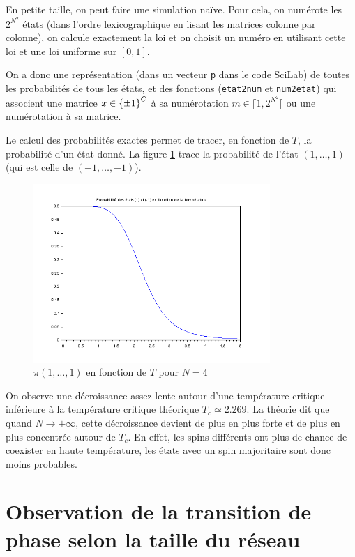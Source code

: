 \documentclass[a4paper,11pt]{article}
\begin{document}
En petite taille, on peut faire une simulation naïve. Pour cela, on numérote les $2^{N^2}$ états (dans l'ordre lexicographique en lisant les matrices colonne par colonne), on calcule exactement la loi et on choisit un numéro en utilisant cette loi et une loi uniforme sur $[0,1]$.

On a donc une représentation (dans un vecteur \texttt{p} dans le code SciLab) de toutes les probabilités de tous les états, et des fonctions (\texttt{etat2num} et \texttt{num2etat}) qui associent une matrice $x \in \left\lbrace \pm 1 \right\rbrace^C$ à sa numérotation $m \in \llbracket 1,2^{N^2} \rrbracket$ ou une numérotation à sa matrice.

Le calcul des probabilités exactes permet de tracer, en fonction de $T$, la probabilité d'un état donné. La figure \ref{fig:tc_naive_N4} trace la probabilité de l'état $(1,\hdots,1)$ (qui est celle de $(-1,\hdots,-1)$).
\begin{figure}[!htbp]
	\label{fig:tc_naive_N4}
	\includegraphics[width=0.8\textwidth]{temperature_critique_naive_N4.png}
	\caption{$\pi(1,\hdots,1)$ en fonction de $T$ pour $N = 4$}
\end{figure}
On observe une décroissance assez lente autour d'une température critique inférieure à la température critique théorique $T_c \simeq 2.269$. La théorie dit que quand $N \rightarrow +\infty$, cette décroissance devient de plus en plus forte et de plus en plus concentrée autour de $T_c$. En effet, les spins différents ont plus de chance de coexister en haute température, les états avec un spin majoritaire sont donc moins probables.

\section{Observation de la transition de phase selon la taille du réseau}\label{sec:tc}
\end{document}
